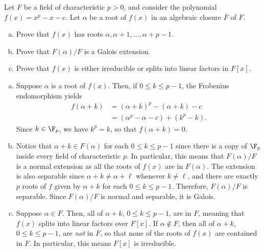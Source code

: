 \documentclass[10pt]{mypackage}
\begin{document}
\begin{problem}[Problem 8]
  Let $F$ be a field of characteristic $p > 0$, and consider the polynomial $f(x) = x^{p}-x-c$. Let $\alpha$ be a root of $f(x)$ in an algebraic closure $ \overline{F} $ of $F$.
  \begin{enumerate}[(a)]
    \item Prove that $f(x)$ has roots $\alpha,\alpha + 1,\dots,\alpha + p - 1$.
    \item Prove that $F\left( \alpha \right)/F$ is a Galois extension.
    \item Prove that $f(x)$ is either irreducible or splits into linear factors in $F[x]$.
  \end{enumerate}
\end{problem}
\begin{solution}\hfill
  \begin{enumerate}[(a)]
    \item Suppose $\alpha$ is a root of $f(x)$. Then, if $0\leq k \leq p-1$, the Frobenius endomorphism yields
      \begin{align*}
        f\left( \alpha + k \right) &= \left( \alpha + k \right)^{p} - \left( \alpha + k \right) - c\\
                                   &= \left( \alpha^{p} - \alpha - c \right) + \left( k^{p} - k \right).
      \end{align*}
      Since $k\in \F_p$, we have $k^{p} = k$, so that $f\left( \alpha + k \right) = 0$.
    \item Notice that $\alpha + k\in F(\alpha)$ for each $0\leq k \leq p-1$ since there is a copy of $\F_p$ inside every field of characteristic $p$. In particular, this means that $F\left( \alpha \right)/F$ is a normal extension as all the roots of $f(x)$ are in $F(\alpha)$. The extension is also separable since $\alpha + k \neq \alpha + \ell$ whenever $k\neq \ell$, and there are exactly $p$ roots of $f$ given by $\alpha + k$ for each $0\leq k \leq p-1$. Therefore, $F(\alpha)/F$ is separable. Since $F\left( \alpha \right)/F$ is normal and separable, it is Galois.
    \item Suppose $\alpha\in F$. Then, all of $\alpha + k$, $0\leq k \leq p-1$, are in $F$, meaning that $f(x)$ splits into linear factors over $F[x]$. If $\alpha\notin F$, then all of $\alpha + k$, $0\leq k \leq p-1$, are \textit{not} in $F$, so that none of the roots of $f(x)$ are contained in $F$. In particular, this means $F[x]$ is irreducible.
  \end{enumerate}
\end{solution}
\end{document}
